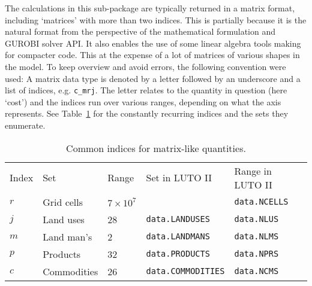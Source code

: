 \documentclass{draft}
\begin{document}
The calculations in this sub-package are typically returned in a matrix format, including `matrices' with more than two indices. This is partially because it is the natural format from the perspective of the mathematical formulation and GUROBI solver API. It also enables the use of some linear algebra tools making for compacter code. This at the expense of a lot of matrices of various shapes in the model. To keep overview and avoid errors, the following convention were used: A matrix data type is denoted by a letter followed by an underscore and a list of indices, e.g. \texttt{c_mrj}. The letter relates to the quantity in question (here `cost') and the indices run over various ranges, depending on what the axis represents. See Table~\ref{tab:indices} for the constantly recurring indices and the sets they enumerate.
\begin{table}
\centering
\begin{tabular}{lllll}
Index   & Set         & Range                                                & Set in LUTO II                                           & Range in LUTO II                                     \\
$ r $ & Grid cells  & $7 \times 10^7$ &                                                          & \texttt{data.NCELLS}  \\
$ j $ & Land uses   & 28                                                   & \texttt{data.LANDUSES}    & \texttt{data.NLUS}    \\
$ m $ & Land man's   & 2                                                   & \texttt{data.LANDMANS}    & \texttt{data.NLMS}    \\
$ p $ & Products    & 32                                                   & \texttt{data.PRODUCTS}    & \texttt{data.NPRS}    \\
$ c $ & Commodities & 26                                                   & \texttt{data.COMMODITIES} & \texttt{data.NCMS}
\end{tabular}
\caption{Common indices for matrix-like quantities.}
\label{tab:indices}
\end{table}
\end{document}

